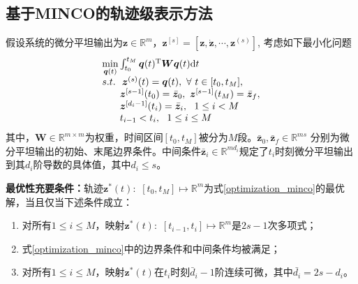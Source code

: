 \subsection{基于MINCO的轨迹级表示方法}
假设系统的微分平坦输出为$\boldsymbol{z} \in \mathbb{R}^m$，$\boldsymbol{z}^{[s]} = [\boldsymbol{z}, \dot{\boldsymbol{z}}, \cdots, \boldsymbol{z}^{(s)}]$, 考虑如下最小化问题
\begin{equation}\label{optimization_minco}
    \begin{array}{l}
        \mathop {\min }\limits_{\boldsymbol{q}(t)} \int_{{t_0}}^{{t_M}} \boldsymbol{q}(t){\rm{^T}}\boldsymbol{W}\boldsymbol{q}(t){\rm{d}}t\\
        s.t. \,\,\,\, \boldsymbol{z}^{(s)}(t) = \boldsymbol{q}(t),\,\, \forall \,\, t \in [t_0, t_M], \\
        \,\,\,\,\,\,\,\,\,\,\, \boldsymbol{z}^{[s-1]}(t_0) = \bar{\boldsymbol{z}}_0, \,\, \boldsymbol{z}^{[s-1]}(t_M) = \bar{\boldsymbol{z}}_f,\\
        \,\,\,\,\,\,\,\,\,\,\, \boldsymbol{z}^{[d_i-1]}(t_i) = \bar{\boldsymbol{z}}_i, \,\,\,\, 1 \le i  < M\\
        \,\,\,\,\,\,\,\,\,\,\,  t_{i-1} < t_i, \,\,\,\, 1 \le i \le M
    \end{array}
\end{equation}
其中，$\boldsymbol{W}\in \mathbb{R}^{m\times m}$为权重，时间区间$[t_0, t_M]$被分为$M$段。$\bar{\boldsymbol{z}}_0, \bar{\boldsymbol{z}}_f \in \mathbb{R}^{ms}$ 分别为微分平坦输出的初始、末尾边界条件。中间条件$\bar{\boldsymbol{z}}_i \in \mathbb{R}^{md_i}$规定了$t_i$时刻微分平坦输出到其$d_i$阶导数的具体值，其中$d_i \le s$。

\textbf{最优性充要条件：}轨迹$\boldsymbol{z}^*(t):\,\,[t_0,t_M] \mapsto \mathbb{R}^m$为式\ref{optimization_minco}的最优解，当且仅当下述条件成立：
\begin{enumerate}
    \item 对所有$1 \le i \le M$，映射$\boldsymbol{z}^*(t):\,\,[t_{i-1},t_i] \mapsto \mathbb{R}^m$是$2s-1$次多项式；
    \item 式\ref{optimization_minco}中的边界条件和中间条件均被满足；
    \item 对所有$1 \le i \le M$，映射$\boldsymbol{z}^*(t)$在$t_i$时刻$\bar{d}_i-1$阶连续可微，其中$\bar{d_i} = 2s-d_i$。
\end{enumerate}

